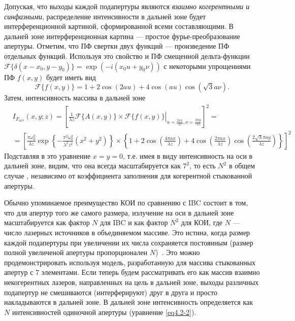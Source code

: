 Допуская, что выходы каждой подапертуры являются \textit{взаимно когерентными и синфазными}, распределение интенсивности в дальней зоне будет интерференционной картиной, сформированной всеми составляющими. В дальней зоне интерференционная картина --- простое фурье-преобразование апертуры. Отметим, что ПФ свертки двух функций --- произведение ПФ отдельных функций. Используя это свойство и ПФ смещенной дельта-функции $\mathcal F\{\delta(x-x_0,y-y_0)\}=\exp(-i(x_0u+y_0\nu))$ с некоторыми упрощениями ПФ $f(x, y)$ будет иметь вид
$$
\mathcal F\{f(x,y)\}=1+2\cos(2au)+4\cos(au)\cos(\sqrt{3}a\nu).
$$
Затем, интенсивность массива в дальней зоне
\begin{equation}\label{eq4.2-4}
\begin{split}
  &I_{F_{arr}}(x,y;z)=\left[\left.\frac{1}{\lambda z}\mathcal F\{A(x,y)\}\times\mathcal F\{f(x,y)\}\right|_{u=\frac{2\pi x}{\lambda z}, \nu=\frac{2\pi y}{\lambda z}}\right]^2= \\
  &=\left[\frac{\pi \omega_0^2}{\lambda z}\exp\left\{-\frac{\pi^2\omega_0^2}{\lambda^2z^2}(x^2+y^2)\right\}\times\left\{1+2\cos\left(\frac{4\pi ax}{\lambda z}\right)+4\cos\left(\frac{2\pi ax}{\lambda z}\right)\cos\left(\frac{2\sqrt{3}\pi ay}{\lambda z}\right)\right\}\right]^2
\end{split}
\end{equation}
Подставляя в это уравнение $x=y=0$, т.е. имея в виду интенсивность на оси в дальней зоне, видим, что она всегда масштабируется как $7^2$, то есть $N^2$ в общем случае , независимо от коэффициента заполнения для когерентной стыкованной апертуры.

Обычно упоминаемое преимущество КОИ по сравнению с IBC состоит в том, что для апертур того же самого размера, излучение на оси в дальней зоне масштабируется как фактор $N$ для IBC и как фактор $N^2$ для КОИ, где $N$ --- число лазерных источников в объединяемом массиве. Это истина, когда размер каждой подапертуры при увеличении их числа сохраняется постоянным (размер полной увеличеной апертуры пропорционален $N$)~\cite{Jain46}. Это можно продемонстрировать используя модель, разработанную для массива стыкованных апертур с 7 элементами. Если теперь будем рассматривать его как массив взаимно некогерентных лазеров, направленных на цель в дальней зоне, выходы различных подапертур не смешиваются (интерферируют) друг в друга и просто накладываются в дальней зоне. В дальней зоне интенсивность определяется как $N$ интенсивностей одиночной апертуры (уравнение \eqref{eq4.2-2}).


